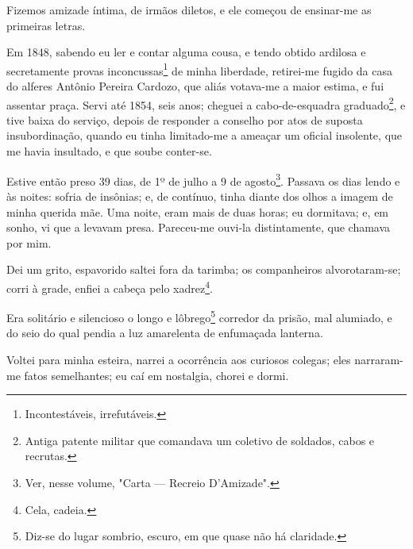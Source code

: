 Fizemos amizade íntima, de irmãos diletos, e ele começou de ensinar-me
as primeiras letras.

Em 1848, sabendo eu ler e contar alguma cousa, e tendo obtido ardilosa e
secretamente provas inconcussas\footnote{Incontestáveis, irrefutáveis.}
de minha liberdade, retirei-me fugido da casa do alferes Antônio Pereira
Cardozo, que aliás votava-me a maior estima, e fui assentar praça. Servi
até 1854, seis anos; cheguei a cabo-de-esquadra graduado\footnote{
  Antiga patente militar que comandava um coletivo de soldados, cabos e
  recrutas.}, e tive baixa do serviço, depois de responder a conselho
por atos de suposta insubordinação, quando eu tinha limitado-me a
ameaçar um oficial insolente, que me havia insultado, e que soube
conter-se.

Estive então preso 39 dias, de 1º de julho a 9 de agosto\footnote{Ver,
  nesse volume, "Carta --- Recreio D'Amizade".}. Passava os dias lendo
e às noites: sofria de insônias; e, de contínuo, tinha diante dos olhos
a imagem de minha querida mãe. Uma noite, eram mais de duas horas; eu
dormitava; e, em sonho, vi que a levavam presa. Pareceu-me ouvi-la
distintamente, que chamava por mim.

Dei um grito, espavorido saltei fora da tarimba; os companheiros
alvorotaram-se; corri à grade, enfiei a cabeça pelo xadrez\footnote{
  Cela, cadeia.}.

Era solitário e silencioso o longo e lôbrego\footnote{Diz-se do lugar
  sombrio, escuro, em que quase não há claridade.} corredor da prisão,
mal alumiado, e do seio do qual pendia a luz amarelenta de enfumaçada
lanterna.

Voltei para minha esteira, narrei a ocorrência aos curiosos colegas;
eles narraram-me fatos semelhantes; eu caí em nostalgia, chorei e dormi.

